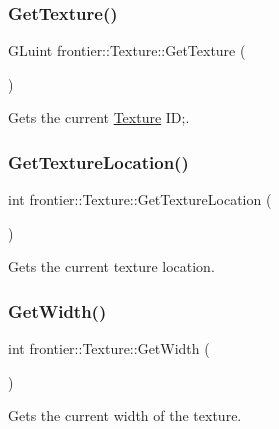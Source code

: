 \subsubsection{\texorpdfstring{Get\+Texture()}{GetTexture()}}
{\footnotesize\ttfamily G\+Luint frontier\+::\+Texture\+::\+Get\+Texture (\begin{DoxyParamCaption}{ }\end{DoxyParamCaption})}



Gets the current \hyperlink{classfrontier_1_1_texture}{Texture} ID;. 

\mbox{\label{classfrontier_1_1_texture_a93935a9af5c67d31eaf7c8074dbb13c5}} 
\subsubsection{\texorpdfstring{Get\+Texture\+Location()}{GetTextureLocation()}}
{\footnotesize\ttfamily int frontier\+::\+Texture\+::\+Get\+Texture\+Location (\begin{DoxyParamCaption}{ }\end{DoxyParamCaption})}



Gets the current texture location. 

\mbox{\label{classfrontier_1_1_texture_acd83cfddc6017cf76ccc37294a9c38be}} 
\subsubsection{\texorpdfstring{Get\+Width()}{GetWidth()}}
{\footnotesize\ttfamily int frontier\+::\+Texture\+::\+Get\+Width (\begin{DoxyParamCaption}{ }\end{DoxyParamCaption})}



Gets the current width of the texture. 

\mbox{\label{classfrontier_1_1_texture_aa927deb382a4b19374edc030c76ed1c6}} 
